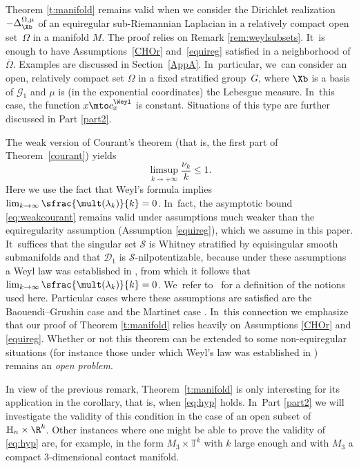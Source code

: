 \begin{remark} \label{remdom}
Theorem \ref{t:manifold} remains valid when we consider the Dirichlet realization $-\Delta^{\Omega,\mu}_\Xb$ of an equiregular sub-Riemannian Laplacian in a relatively compact open set~$\Omega$ in a manifold $M$. The proof relies on Remark \ref{rem:weylsubsets}. It~is enough to have Assumptions~\ref{CHOr} and~\ref{equireg} satisfied in a neighborhood of $\overline{\Omega}$.
Examples are discussed in Section~\ref{AppA}. In~particular, we~can consider an open, relatively compact set $\Omega$ in a fixed stratified group~$G$, where $\Xb$ is a basis of $\mathcal G_1$
and $\mu$ is (in the exponential coordinates) the Lebesgue measure. In~this case, the function $x\mto c^\Weyl_x$ is constant. Situations of this type are further discussed in Part \ref{part2}.
\end{remark}

\begin{remark}\label{remcourantasymp}
The weak version of Courant's theorem (that is, the first part of Theorem~\ref{courant}) yields
\begin{equation}\label{eq:weakcourant}
\limsup_{k\to+\infty} \frac{\nu_k}k \leq 1.
\end{equation}
Here we use the fact that Weyl's formula implies $\lim_{k\to\infty} \sfrac{\mult(\lambda_k)}{k}=0$. In~fact, the asymptotic bound \eqref{eq:weakcourant} remains valid under assumptions much weaker than the equiregularity assumption (Assumption \ref{equireg}), which we assume in this paper. It~suffices that the singular set $\mathcal S$ is Whitney stratified by equisingular smooth submanifolds and that $\mathcal D_1$ is $\mathcal S$-nilpotentizable, because under these assumptions a Weyl law was established in \cite{CHT1}, from which it follows that $\lim_{k\to\infty} \sfrac{\mult(\lambda_k)}{k}=0$. We~refer to~\cite{CHT1} for a definition of the notions used here. Particular cases where these assumptions are satisfied are the Baouendi--Grushin case \cite[Th.\,7.2]{CHT1} and the Martinet case \cite[Th.\,7.3]{CHT1}. In~this connection we emphasize that our proof of Theorem \ref{t:manifold} relies heavily on Assumptions \ref{CHOr} and \ref{equireg}. Whether or not this theorem can be extended to some non-equiregular situations (for instance those under which Weyl's law was established in \cite{CHT1}) remains an \emph{open problem}.
\end{remark}

In view of the previous remark, Theorem~\ref{t:manifold} is only interesting for its application in the corollary, that is, when \eqref{eq:hyp} holds. In~Part \ref{part2} we will investigate the validity of this condition in the case of an open subset of $\mathbb H_n\times\R^k$. Other instances where one might be able to prove the validity of \eqref{eq:hyp} are, for example, in the form $M_3\times \mathbb T^k$ with $k$ large enough and with $M_3$ a compact $3$-dimensional contact manifold.

